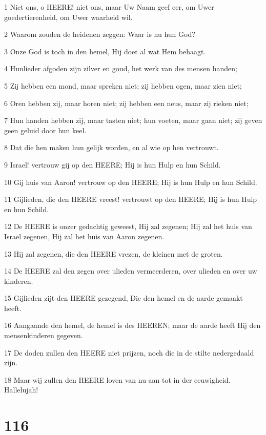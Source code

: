 \par 1 Niet ons, o HEERE! niet ons, maar Uw Naam geef eer, om Uwer goedertierenheid, om Uwer waarheid wil.
\par 2 Waarom zouden de heidenen zeggen: Waar is nu hun God?
\par 3 Onze God is toch in den hemel, Hij doet al wat Hem behaagt.
\par 4 Hunlieder afgoden zijn zilver en goud, het werk van des mensen handen;
\par 5 Zij hebben een mond, maar spreken niet; zij hebben ogen, maar zien niet;
\par 6 Oren hebben zij, maar horen niet; zij hebben een neus, maar zij rieken niet;
\par 7 Hun handen hebben zij, maar tasten niet; hun voeten, maar gaan niet; zij geven geen geluid door hun keel.
\par 8 Dat die hen maken hun gelijk worden, en al wie op hen vertrouwt.
\par 9 Israel! vertrouw gij op den HEERE; Hij is hun Hulp en hun Schild.
\par 10 Gij huis van Aaron! vertrouw op den HEERE; Hij is hun Hulp en hun Schild.
\par 11 Gijlieden, die den HEERE vreest! vertrouwt op den HEERE; Hij is hun Hulp en hun Schild.
\par 12 De HEERE is onzer gedachtig geweest, Hij zal zegenen; Hij zal het huis van Israel zegenen, Hij zal het huis van Aaron zegenen.
\par 13 Hij zal zegenen, die den HEERE vrezen, de kleinen met de groten.
\par 14 De HEERE zal den zegen over ulieden vermeerderen, over ulieden en over uw kinderen.
\par 15 Gijlieden zijt den HEERE gezegend, Die den hemel en de aarde gemaakt heeft.
\par 16 Aangaande den hemel, de hemel is des HEEREN; maar de aarde heeft Hij den mensenkinderen gegeven.
\par 17 De doden zullen den HEERE niet prijzen, noch die in de stilte nedergedaald zijn.
\par 18 Maar wij zullen den HEERE loven van nu aan tot in der eeuwigheid. Hallelujah!

\chapter{116}

